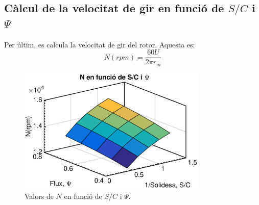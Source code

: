 \subsection{Càlcul de la velocitat de gir en funció de $S/C$ i $\Psi$}
Per últim, es calcula la velocitat de gir del rotor. Aquesta es: 
\begin{equation}
N(rpm)=\frac{60U}{2\pi r_m}
\end{equation}

\begin{figure}[H]
	\centering
	\includegraphics[width=0.8\textwidth]{./code/figures/parametres/RPM}
	\caption{Valors de $N$ en funció de $S/C$ i $\Psi$.}
	\label{RPM}
\end{figure}